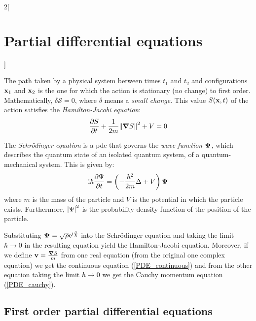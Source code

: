 \documentclass[../../../main.tex]{subfiles}
\begin{document}
\begin{multicols}{2}[\section{Partial differential equations}]
  \begin{proposition}
    The path taken by a physical system between times $t_1$ and $t_2$ and configurations $\boldsymbol{\mathrm{x}}_1$ and $\boldsymbol{\mathrm{x}}_2$ is the one for which the action is stationary (no change) to first order. Mathematically, $\delta \mathcal{S}=0$, where $\delta$ means a \emph{small change}. This value $S(\boldsymbol{\mathrm{x}},t)$ of the action satisfies the \emph{Hamilton-Jacobi equation}: $$\pdv{S}{t}+\frac{1}{2m}{\|\grad S\|}^2+V=0$$
  \end{proposition}
  \begin{proposition}
    The \emph{Schrödinger equation} is a pde that governs the \emph{wave function} $\boldsymbol{\mathrm{\Psi}}$, which describes the quantum state of an isolated quantum system, of a quantum-mechanical system. This is given by: $$\mathrm{i} \hbar\pdv{\Psi}{t}=\left(-\frac{\hbar^2}{2m}\Delta+V\right)\boldsymbol{\mathrm{\Psi}}$$ where $m$ is the mass of the particle and $V$ is the potential in which the particle exists. Furthermore, $\abs{\Psi}^2$ is the probability density function of the position of the particle.
  \end{proposition}
  \begin{proposition}
    Substituting $\boldsymbol{\mathrm{\Psi}}=\sqrt{\rho}\mathrm{e}^{\mathrm{i} \frac{S}{\hbar}}$ into the Schrödinger equation and taking the limit $\hbar\to 0$ in the resulting equation yield the Hamilton-Jacobi equation. Moreover, if we define $\boldsymbol{\mathrm{v}}=\frac{\grad{S}}{m}$ from one real equation (from the original one complex equation) we get the continuous equation (\cref{PDE_continuous}) and from the other equation taking the limit $\hbar\to 0$ we get the Cauchy momentum equation (\cref{PDE_cauchy}).
  \end{proposition}
  \subsection{First order partial differential equations}

\end{multicols}
\end{document}
